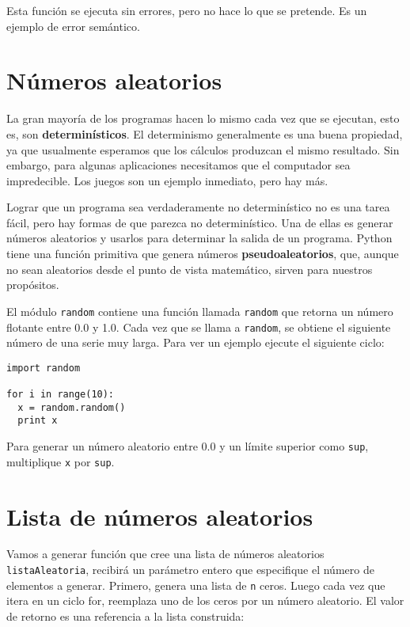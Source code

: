 Esta función se ejecuta sin errores, pero no hace lo que se pretende.
Es un ejemplo de error semántico.





\section{Números aleatorios}

La gran mayoría de los programas hacen lo mismo cada vez que se ejecutan,
esto es, son  {\bf determinísticos}.  El determinismo generalmente es 
una buena propiedad, ya que usualmente esperamos que los cálculos
produzcan el mismo resultado. Sin embargo, para algunas aplicaciones
necesitamos que el computador sea impredecible. Los juegos son un 
ejemplo inmediato, pero hay más.

Lograr que un programa sea verdaderamente no determinístico no es una
tarea fácil, pero hay formas de que parezca no determinístico. Una
de ellas es generar números aleatorios y usarlos para determinar
la salida de un programa. Python tiene una función primitiva
que genera números {\bf pseudoaleatorios}, que, aunque no sean
aleatorios desde el punto de vista matemático, sirven para nuestros
propósitos.

El módulo  \texttt{random} contiene una función llamada \texttt{random} que
retorna un número flotante entre 0.0 y 1.0.  Cada vez que se llama a
\texttt{random}, se obtiene el siguiente número de una serie muy larga.
Para ver un ejemplo ejecute el siguiente ciclo:

\beforeverb
\begin{verbatim}
import random

for i in range(10):
  x = random.random()
  print x
\end{verbatim}
\afterverb
%
Para generar un número aleatorio entre 0.0 y un límite superior
como \texttt{sup}, multiplique \texttt{x} por \texttt{sup}.



\section{Lista de números aleatorios}

Vamos a generar función que cree una lista de números aleatorios \texttt{listaAleatoria},
recibirá un parámetro entero que especifique el número de elementos a generar.
Primero, genera una lista de  \texttt{n} ceros. Luego cada vez que itera 
en un ciclo for, reemplaza uno de los ceros por un número aleatorio.
El valor de retorno es una referencia a la lista construida:

